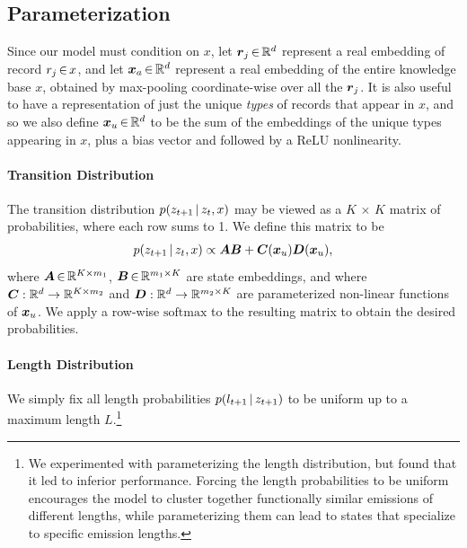 \documentclass[11pt,a4paper]{article}
\begin{document}
\subsection{Parameterization}

Since our model must condition on $x$, let $\boldsymbol{r}_j \, {\in} \, \mathbb{R}^d$ represent a real embedding of record $r_j \, {\in} \, x$, and let $\boldsymbol{x}_a \, {\in} \, \mathbb{R}^d$ represent a real embedding of the entire knowledge base $x$, obtained by max-pooling coordinate-wise over all the $\boldsymbol{r}_j$. It is also useful to have a representation of just the unique \textit{types} of records that appear in $x$, and so we also define $\boldsymbol{x}_u \, {\in} \, \mathbb{R}^d$ to be the sum of the embeddings of the unique types appearing in $x$, plus a bias vector and followed by a ReLU nonlinearity.


\vspace{-0.15cm}
 \paragraph{Transition Distribution} The transition distribution $p(z_{t+1} \,|\, z_{t}, x)$ may be viewed as a $K \, {\times} \, K$ matrix of probabilities, where each row sums to 1. We define this matrix to be 
\begin{align*}
    p(z_{t+1} \,|\, z_{t}, x) \propto \boldsymbol{A} \boldsymbol{B} + \boldsymbol{C}(\boldsymbol{x}_u) \boldsymbol{D}(\boldsymbol{x}_u),
\end{align*}
where $\boldsymbol{A} \, {\in} \, \mathbb{R}^{K \times m_1}$, $\boldsymbol{B} \, {\in} \, \mathbb{R}^{m_1 \times K}$ are state embeddings, and where $\boldsymbol{C} : \mathbb{R}^d \rightarrow \mathbb{R}^{K \times m_2}$ and $\boldsymbol{D} : \mathbb{R}^d \rightarrow \mathbb{R}^{m_2 \times K}$ are parameterized non-linear functions of $\boldsymbol{x}_u$. We apply a row-wise $\mathrm{softmax}$ to the resulting matrix to obtain the desired probabilities. 

\vspace{-0.15cm}
\paragraph{Length Distribution}
We simply fix all length probabilities $p(l_{t+1} \,|\, z_{t+1})$ to be uniform up to a maximum length $L$.\footnote{We experimented with parameterizing the length distribution, but found that it led to inferior performance. Forcing the length probabilities to be uniform encourages the model to cluster together functionally similar emissions of different lengths, while parameterizing them can lead to states that specialize to specific emission lengths.}  %
\end{document}
